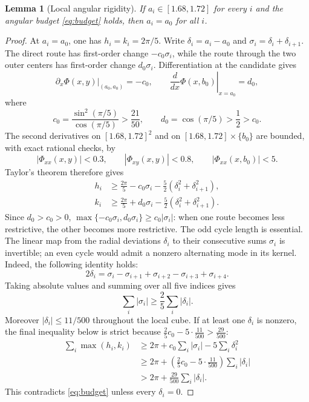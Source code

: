 \documentclass[11pt]{article}
\newtheorem{lemma}[theorem]{Lemma}
\theoremstyle{definition}
\newcommand{\ph}{\Phi}
\begin{document}
\begin{lemma}[Local angular rigidity]\label{lem:local-rigidity}
If $a_i\in[1.68,1.72]$ for every $i$ and the angular budget \eqref{eq:budget} holds, then $a_i=a_0$ for all $i$.
\end{lemma}
\begin{proof}
At $a_i=a_0$, one has $h_i=k_i=2\pi/5$. Write $\delta_i=a_i-a_0$ and $\sigma_i=\delta_i+\delta_{i+1}$. The direct route has first-order change $-c_0\sigma_i$, while the route through the two outer centers has first-order change $d_0\sigma_i$. Differentiation at the candidate gives
\[
 \left.\partial_x\ph(x,y)\right|_{(a_0,a_0)}=-c_0,
 \qquad
 \left.\frac{d}{dx}\ph(x,b_0)\right|_{x=a_0}=d_0,
\]
where
\[
 c_0=\frac{\sin^2(\pi/5)}{\cos(\pi/5)}>\frac{21}{50},
 \qquad d_0=\cos(\pi/5)>\frac12>c_0.
\]
The second derivatives on $[1.68,1.72]^2$ and on $[1.68,1.72]\times\{b_0\}$ are bounded, with exact rational checks, by
\[
 |\ph_{xx}(x,y)|<0.3,\qquad |\ph_{xy}(x,y)|<0.8,
 \qquad |\ph_{xx}(x,b_0)|<5.
\]
Taylor's theorem therefore gives
\begin{align*}
 h_i&\ge\frac{2\pi}{5}-c_0\sigma_i-\frac52(\delta_i^2+\delta_{i+1}^2),\\
 k_i&\ge\frac{2\pi}{5}+d_0\sigma_i-\frac52(\delta_i^2+\delta_{i+1}^2).
\end{align*}
Since $d_0>c_0>0$, $\max\{-c_0\sigma_i,d_0\sigma_i\}\ge c_0|\sigma_i|$: when one route becomes less restrictive, the other becomes more restrictive. The odd cycle length is essential. The linear map from the radial deviations $\delta_i$ to their consecutive sums $\sigma_i$ is invertible; an even cycle would admit a nonzero alternating mode in its kernel. Indeed, the following identity holds:
\[
 2\delta_i=\sigma_i-\sigma_{i+1}+\sigma_{i+2}-\sigma_{i+3}+\sigma_{i+4}.
\]
Taking absolute values and summing over all five indices gives
\[
 \sum_i|\sigma_i|\ge\frac25\sum_i|\delta_i|.
\]
Moreover $|\delta_i|\le11/500$ throughout the local cube. If at least one $\delta_i$ is nonzero, the final inequality below is strict because $\frac25c_0-5\cdot\frac{11}{500}>\frac{29}{500}$:
\begin{align*}
\sum_i\max(h_i,k_i)
 &\ge 2\pi+c_0\sum_i|\sigma_i|-5\sum_i\delta_i^2\\
 &\ge 2\pi+\left(\frac25c_0-5\cdot\frac{11}{500}\right)\sum_i|\delta_i|\\
&>2\pi+\frac{29}{500}\sum_i|\delta_i|.
\end{align*}
This contradicts \eqref{eq:budget} unless every $\delta_i=0$.
\end{proof}
\end{document}
